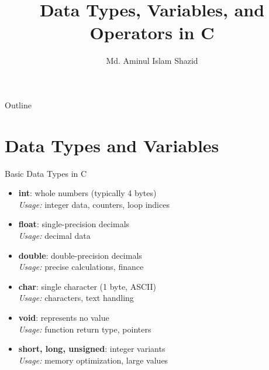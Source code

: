 \documentclass[12pt, aspectratio=169]{beamer}
\title{Data Types, Variables, and Operators in C}
\author{Md. Aminul Islam Shazid}
\date{}
\begin{document}
    {
		\addtocounter{framenumber}{-2}    %

		\begin{frame}
			\titlepage
		\end{frame}

		\begin{frame}{Outline}
            \vfill
			\tableofcontents[subsectionstyle=hide]
            \vfill
		\end{frame}
	}

    \section{Data Types and Variables}

    \begin{frame}{Basic Data Types in C}
        \begin{itemize}
            \item \textbf{int}: whole numbers (typically 4 bytes) \\
                \textit{Usage:} integer data, counters, loop indices
            \item \textbf{float}: single-precision decimals \\
                \textit{Usage:} decimal data
            \item \textbf{double}: double-precision decimals\\
                \textit{Usage:} precise calculations, finance
            \item \textbf{char}: single character (1 byte, ASCII) \\
                \textit{Usage:} characters, text handling
            \item \textbf{void}: represents no value \\
                \textit{Usage:} function return type, pointers
            \item \textbf{short, long, unsigned}: integer variants \\
                \textit{Usage:} memory optimization, large values
        \end{itemize}
    \end{frame}
\end{document}
